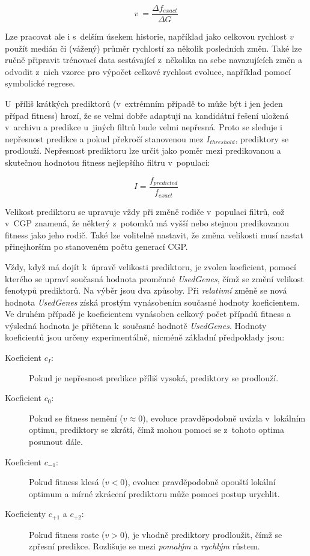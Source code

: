 \begin{equation}
    \label{eqVelocity}
    v~= \frac{\Delta{}f_{\mathit{exact}}}{\Delta{}G}
\end{equation}

Lze pracovat ale i s~delším úsekem historie, například jako celkovou rychlost $v$ použít medián či (vážený) průměr rychlostí za několik posledních změn. Také lze ručně připravit trénovací data sestávající z~několika na sebe navazujících změn a odvodit z~nich vzorec pro výpočet celkové rychlost evoluce, například pomocí symbolické regrese.

U~příliš krátkých prediktorů (v~extrémním případě to může být i jen jeden případ fitness) hrozí, že se velmi dobře adaptují na kandidátní řešení uložená v~archivu a predikce u~jiných filtrů bude velmi nepřesná. Proto se sleduje i nepřesnost predikce a pokud překročí stanovenou mez $I_\mathit{threshold}$, prediktory se prodlouží. Nepřesnost prediktoru lze určit jako poměr mezi predikovanou a skutečnou hodnotou fitness nejlepšího filtru v~populaci:

\begin{equation}
    \label{eqInaccuracy}
    \mathit{I} = \frac{f_{\mathit{predicted}}}{f_{\mathit{exact}}}
\end{equation}

Velikost prediktoru se upravuje vždy při změně rodiče v~populaci filtrů, což v~CGP znamená, že některý z~potomků má vyšší nebo stejnou predikovanou fitness jako jeho rodič. Také lze volitelně nastavit, že změna velikosti musí nastat přinejhorším po stanoveném počtu generací CGP.

Vždy, když má dojít k~úpravě velikosti prediktoru, je zvolen koeficient, pomocí kterého se upraví současná hodnota proměnné \emph{UsedGenes}, čímž se změní velikost fenotypů prediktorů. Na výběr jsou dva způsoby. Při \emph{relativní} změně se nová hodnota \emph{UsedGenes} získá prostým vynásobením současné hodnoty koeficientem. Ve druhém případě je koeficientem vynásoben celkový počet případů fitness a výsledná hodnota je přičtena k~současné hodnotě \emph{UsedGenes}. Hodnoty koeficientů jsou určeny experimentálně, nicméně základní předpoklady jsou:

\begin{description}
    \item[Koeficient $c_I$:] Pokud je nepřesnost predikce příliš vysoká, prediktory se prodlouží.
    \item[Koeficient $c_{0}$:] Pokud se fitness nemění ($v \approx 0$), evoluce pravděpodobně uvázla v~lokálním optimu, prediktory se zkrátí, čímž mohou pomoci se z~tohoto optima posunout dále.
    \item[Koeficient $c_{-1}$:] Pokud fitness klesá ($v < 0$), evoluce pravděpodobně opouští lokální optimum a mírné zkrácení prediktoru může pomoci postup urychlit.
    \item[Koeficienty $c_{+1}$ a $c_{+2}$:] Pokud fitness roste ($v > 0$), je vhodně prediktory prodloužit, čímž se zpřesní predikce. Rozlišuje se mezi \emph{pomalým} a \emph{rychlým} růstem.
\end{description}


